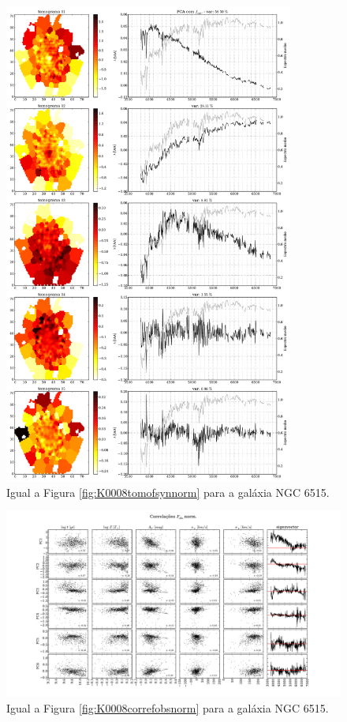 \begin{figure}
    \includegraphics[width=0.85\textwidth]{figuras/K0864-tomo-syn-norm.pdf}
    \caption[Tomogramas de 1 a 5 para o cubo $F_{syn}$ norm. - NGC 6515.]
    {Igual a Figura \ref{fig:K0008tomofsynnorm} para a galáxia NGC 6515.}
    \label{fig:K0864tomofsynnorm}
\end{figure}

\begin{figure}
    \includegraphics[width=1.3\textwidth, angle=-90]{figuras/K0864-correl-f_obs_norm-PCvsPhys.pdf}
	\caption[Correlações PCs vs. par\^ametros f\'isicos - $F_{obs}$ norm. - NGC 6515.]
	{Igual a Figura \ref{fig:K0008correfobsnorm} para a galáxia NGC 6515.}
    \label{fig:K0864correfobsnorm}
\end{figure}

